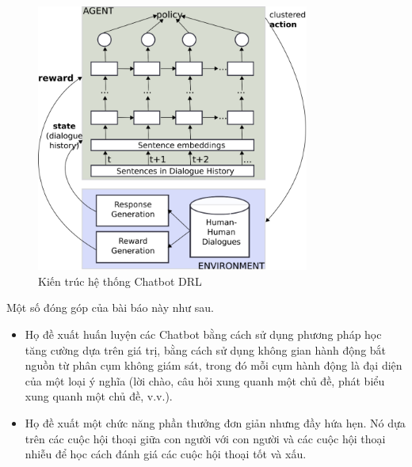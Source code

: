 \begin{figure}[ht]
    \centering
    \includegraphics[width=0.8\textwidth]{thesis/chatbot/congtrinh/img/clusterarch.png}
    \caption{Kiến trúc hệ thống Chatbot DRL}
    \label{fig:clusterarch}
\end{figure}

Một số đóng góp của bài báo này như sau.

\begin{itemize}
    \item Họ đề xuất huấn luyện các Chatbot bằng cách sử dụng
    phương pháp học tăng cường dựa trên giá trị, bằng cách sử dụng
    không gian hành động bắt nguồn từ phân cụm không giám sát,
    trong đó mỗi cụm hành động là đại diện của một loại ý nghĩa
    (lời chào, câu hỏi xung quanh một chủ đề, phát biểu xung quanh
    một chủ đề, v.v.).
    \item Họ đề xuất một chức năng phần thưởng đơn giản nhưng đầy
    hứa hẹn. Nó dựa trên các cuộc hội thoại giữa con người với
    con người và các cuộc hội thoại nhiễu để học cách đánh giá
    các cuộc hội thoại tốt và xấu.
\end{itemize}

